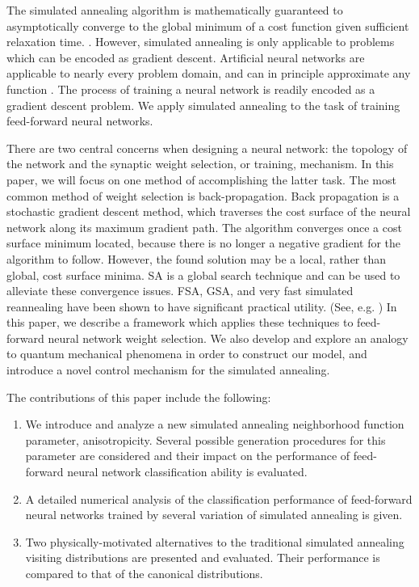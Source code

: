\documentclass[10pt,journal,cspaper,compsoc]{IEEEtran}
\begin{document}
The simulated annealing algorithm is mathematically guaranteed to asymptotically converge to the global minimum of a cost function given sufficient relaxation time. \cite{geman1984stochasticrelaxation,ingber1989veryfastsimulatedreannealing,lecchinivisintini2007sacontinuousgaruntees}. However, simulated annealing is only applicable to problems which can be encoded as gradient descent. Artificial neural networks are applicable to nearly every problem domain, and can in principle approximate any function \cite{cybenko1989approxsuperposition}. The process of training a neural network is readily encoded as a gradient descent problem. We apply simulated annealing to the task of training feed-forward neural networks.

There are two central concerns when designing a neural network: the topology of the network and the synaptic weight selection, or training, mechanism. In this paper, we will focus on one method of accomplishing the latter task. The most common method of weight selection is back-propagation. Back propagation is a stochastic gradient descent method, which traverses the cost surface of the neural network along its maximum gradient path. The algorithm converges once a cost surface minimum located, because there is no longer a negative gradient for the algorithm to follow. However, the found solution may be a local, rather than global, cost surface minima. SA is a global search technique and can be used to alleviate these convergence issues. FSA, GSA, and very fast simulated reannealing have been shown to have significant practical utility. (See, e.g. \cite{laarhoven1987satheoryapplication}) In this paper, we describe a framework which applies these techniques to feed-forward neural network weight selection. We also develop and explore an analogy to quantum mechanical phenomena in order to construct our model, and introduce a novel control mechanism for the simulated annealing.
 
The contributions of this paper include the following:

\begin{enumerate}
	\item We introduce and analyze a new simulated annealing neighborhood function parameter, anisotropicity. Several possible generation procedures for this parameter are considered and their impact on the performance of feed-forward neural network classification ability is evaluated.
	\item A detailed numerical analysis of the classification performance of feed-forward neural networks trained by several variation of simulated annealing is given.
	\item Two physically-motivated alternatives to the traditional simulated annealing visiting distributions are presented and evaluated. Their performance is compared to that of the canonical distributions.
\end{enumerate}
\end{document}
